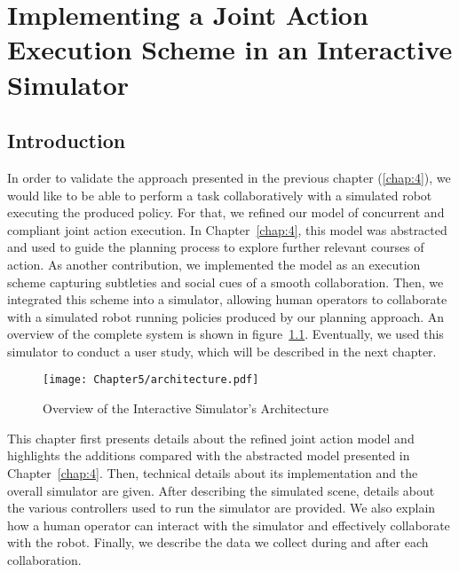 \ifdefined{}
\else
\setcounter{chapter}{4} %
\dominitoc
\faketableofcontents
\fi

\chapter{Implementing a Joint Action Execution Scheme in an Interactive Simulator}
\label{chap:5}
\minitoc


\section{Introduction}

In order to validate the approach presented in the previous chapter (\ref{chap:4}), we would like to be able to perform a task collaboratively with a simulated robot executing the produced policy.
For that, we refined our model of concurrent and compliant joint action execution. In Chapter~\ref{chap:4}, this model was abstracted and used to guide the planning process to explore further relevant courses of action. As another contribution, we implemented the model as an execution scheme capturing subtleties and social cues of a smooth collaboration. Then, we integrated this scheme into a simulator, allowing human operators to collaborate with a simulated robot running policies produced by our planning approach. An overview of the complete system is shown in figure~\ref{fig:architecture}.
Eventually, we used this simulator to conduct a user study, which will be described in the next chapter. 


\begin{figure}[h]
    \texttt{[image: Chapter5/architecture.pdf]}
    \caption{Overview of the Interactive Simulator's Architecture}
    \label{fig:architecture}
\end{figure}

This chapter first presents details about the refined joint action model and highlights the additions compared with the abstracted model presented in Chapter~\ref{chap:4}. Then, technical details about its implementation and the overall simulator are given. After describing the simulated scene, details about the various controllers used to run the simulator are provided. We also explain how a human operator can interact with the simulator and effectively collaborate with the robot. Finally, we describe the data we collect during and after each collaboration. 


